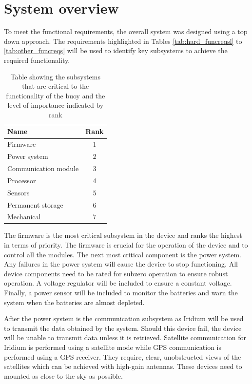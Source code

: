 \section{System overview}
\label{sec:ch3_sysoverview}
To meet the functional requirements, the overall system was designed using a top down approach. The requirements highlighted in Tables \ref{tab:hard_funcreqsl} to \ref{tab:other_funcreqs} will be used to identify key subsystems to achieve the required functionality.

\begin{table}[H]
    \centering
    \caption{Table showing the subsystems that are critical to the functionality of the buoy and the level of importance indicated by rank}
    \begin{tabular}{l c }
    \hline
    \textbf{Name}  & \textbf{Rank}\\
    \hline
    \hline
    Firmware & 1\\
    \hline
    Power system & 2 \\
    \hline
    Communication module  & 3\\
    \hline
    Processor & 4\\
    \hline
    Sensors & 5\\
    \hline
    Permanent storage  & 6 \\
    \hline
    Mechanical & 7 \\
    \hline
    \hline
    \end{tabular}

    \label{tab:subsys}
\end{table}

The firmware is the most critical subsystem in the device and ranks the highest in terms of priority. The firmware is crucial for the operation of the device and to control all the modules. The next most critical component is the power system. Any failures in the power system will cause the device to stop functioning.  All device components need to be rated for subzero operation to ensure robust operation. A voltage regulator will be included to ensure a constant voltage. Finally, a power sensor will be included to monitor the batteries and warn the system when the batteries are almost depleted. \par 

After the power system is the communication subsystem as Iridium will be used to transmit the data obtained by the system. Should this device fail, the device will be unable to transmit data unless it is retrieved. Satellite communication for Iridium is performed using a satellite mode while GPS communication is performed using a GPS receiver. They require, clear, unobstructed views of the satellites which can be achieved with high-gain antennas. These devices need to mounted as close to the sky as possible.\par

